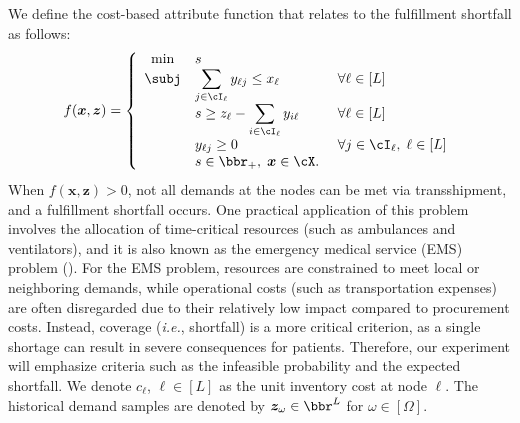 \documentclass[opre, blindrev]{informs4}
\newcommand{\1}[1]{\mathds{1}{\left(#1\right)}}
\begin{document}
We define the cost-based attribute function that relates to the fulfillment shortfall as follows:
\begin{equation} \label{FilfulmentShrotfall}
f(\bm x,\bm z) = \left\{
\begin{array}{cll}
\min &  s\\
\subj & \displaystyle \sum_{j \in \cI_\ell} y_{\ell j} \leq x_\ell &~\forall \ell \in [L]\\
    & \displaystyle s\geq  z_\ell - \sum_{i \in \cI_\ell} y_{i \ell} &~\forall \ell \in [L] \\
    & \displaystyle y_{\ell j} \geq 0 &~\forall  j \in \cI_{\ell}, \; \ell \in [L] \\ 
    & s \in \bbr_+, \; \bm x \in \cX. \\
\end{array} \right.
\end{equation}
When $f(\bm x, \bm z) > 0$, not all demands at the nodes can be met via transshipment, and a fulfillment shortfall occurs. One practical application of this problem involves the allocation of time-critical resources (such as ambulances and ventilators), and it is also known as the emergency medical service (EMS) problem (\citealt{boutilier2020ambulance, peng2020probabilistic}). For the EMS problem, resources are constrained to meet local or neighboring demands, while operational costs (such as transportation expenses) are often disregarded due to their relatively low impact compared to procurement costs. Instead, coverage (\textit{i.e.}, shortfall) is a more critical criterion, as a single shortage can result in severe consequences for patients. Therefore, our experiment will emphasize criteria such as the infeasible probability and the expected shortfall. We denote $c_\ell$, $\ell \in [L]$ as the unit inventory cost at node $\ell$. The historical demand samples are denoted by $\bm z_\omega \in \bbr^L$ for $\omega \in [\Omega]$. 
\end{document}
